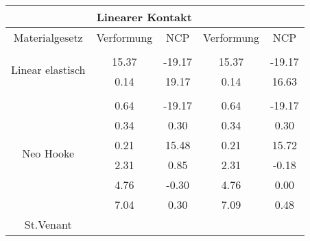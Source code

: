 \begin{table} 
\centering 
\begin{tabular}{c|cc|cc|} 
\cline{2-5} 
 & \multicolumn{2}{|c|}{Linearer Kontakt} &  \\ 
\hline 
\multicolumn{1}{|c|}{Materialgesetz} & \multicolumn{1}{c|}{Verformung} & \multicolumn{1}{c|}{NCP} & \multicolumn{1}{c|}{Verformung} & \multicolumn{1}{c|}{NCP} \\ 
\hline 
\multicolumn{1}{|c|}{\multirow{3}{*}{Linear elastisch}} &\multicolumn{1}{|c|}{} & \multicolumn{1}{|c|}{} & \multicolumn{1}{|c|}{} & \multicolumn{1}{|c|}{} \\ 
\multicolumn{1}{|c|}{} & \multicolumn{1}{|c|}{     15.37} & \multicolumn{1}{|c|}{    -19.17} & \multicolumn{1}{|c|}{     15.37} & \multicolumn{1}{|c|}{    -19.17} \\ 
\multicolumn{1}{|c|}{} & \multicolumn{1}{|c|}{      0.14} & \multicolumn{1}{|c|}{     19.17} & \multicolumn{1}{|c|}{      0.14} & \multicolumn{1}{|c|}{     16.63} \\ 
\hline 
\multicolumn{1}{|c|}{\multirow{7}{*}{Neo Hooke}} &\multicolumn{1}{|c|}{} & \multicolumn{1}{|c|}{} & \multicolumn{1}{|c|}{} & \multicolumn{1}{|c|}{} \\ 
\multicolumn{1}{|c|}{} & \multicolumn{1}{|c|}{      0.64} & \multicolumn{1}{|c|}{    -19.17} & \multicolumn{1}{|c|}{      0.64} & \multicolumn{1}{|c|}{    -19.17} \\ 
\multicolumn{1}{|c|}{} & \multicolumn{1}{|c|}{      0.34} & \multicolumn{1}{|c|}{      0.30} & \multicolumn{1}{|c|}{      0.34} & \multicolumn{1}{|c|}{      0.30} \\ 
\multicolumn{1}{|c|}{} & \multicolumn{1}{|c|}{      0.21} & \multicolumn{1}{|c|}{     15.48} & \multicolumn{1}{|c|}{      0.21} & \multicolumn{1}{|c|}{     15.72} \\ 
\multicolumn{1}{|c|}{} & \multicolumn{1}{|c|}{      2.31} & \multicolumn{1}{|c|}{      0.85} & \multicolumn{1}{|c|}{      2.31} & \multicolumn{1}{|c|}{     -0.18} \\ 
\multicolumn{1}{|c|}{} & \multicolumn{1}{|c|}{      4.76} & \multicolumn{1}{|c|}{     -0.30} & \multicolumn{1}{|c|}{      4.76} & \multicolumn{1}{|c|}{      0.00} \\ 
\multicolumn{1}{|c|}{} & \multicolumn{1}{|c|}{      7.04} & \multicolumn{1}{|c|}{      0.30} & \multicolumn{1}{|c|}{      7.09} & \multicolumn{1}{|c|}{      0.48} \\ 
\hline 
\multicolumn{1}{|c|}{\multirow{6}{*}{St.Venant}} &\multicolumn{1}{|c|}{} & \multicolumn{1}{|c|}{} & \multicolumn{1}{|c|}{} & \multicolumn{1}{|c|}{} \\ 

\end{tabular}
\end{table}
